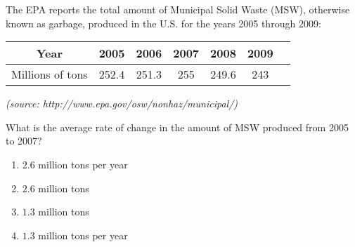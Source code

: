 \bigskip

\item The EPA reports the total amount of Municipal Solid Waste (MSW), otherwise known as garbage, produced in the U.S. for the years 2005 through 2009:

\begin{center}
\begin{tabular}{|c|c|c|c|c|c|c|}
\hline
Year & 2005&2006&2007&2008&2009\\
\hline
Millions of tons & 252.4 & 251.3 & 255 & 249.6 & 243\\
\hline
\end{tabular}
\end{center}

{\it (source: http://www.epa.gov/osw/nonhaz/municipal/)}

\bigskip

What is the average rate of change in the amount of MSW produced from 2005 to 2007?

\begin{enumerate}
\item $2.6$ million tons per year
\item $2.6$ million tons
\item $1.3$ million tons
\item $1.3$ million tons per year
\end{enumerate}


